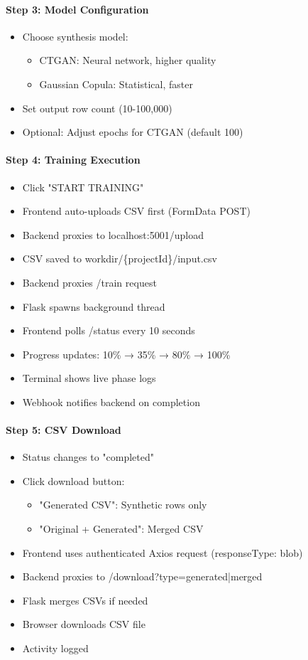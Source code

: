 \documentclass[11pt,a4paper]{article}
\begin{document}
\paragraph{Step 3: Model Configuration}
\begin{itemize}[noitemsep]
    \item Choose synthesis model:
    \begin{itemize}
        \item CTGAN: Neural network, higher quality
        \item Gaussian Copula: Statistical, faster
    \end{itemize}
    \item Set output row count (10-100,000)
    \item Optional: Adjust epochs for CTGAN (default 100)
\end{itemize}

\paragraph{Step 4: Training Execution}
\begin{itemize}[noitemsep]
    \item Click "START TRAINING"
    \item Frontend auto-uploads CSV first (FormData POST)
    \item Backend proxies to localhost:5001/upload
    \item CSV saved to workdir/\{projectId\}/input.csv
    \item Backend proxies /train request
    \item Flask spawns background thread
    \item Frontend polls /status every 10 seconds
    \item Progress updates: 10\% → 35\% → 80\% → 100\%
    \item Terminal shows live phase logs
    \item Webhook notifies backend on completion
\end{itemize}

\paragraph{Step 5: CSV Download}
\begin{itemize}[noitemsep]
    \item Status changes to "completed"
    \item Click download button:
    \begin{itemize}
        \item "Generated CSV": Synthetic rows only
        \item "Original + Generated": Merged CSV
    \end{itemize}
    \item Frontend uses authenticated Axios request (responseType: blob)
    \item Backend proxies to /download?type=generated|merged
    \item Flask merges CSVs if needed
    \item Browser downloads CSV file
    \item Activity logged
\end{itemize}
\end{document}
